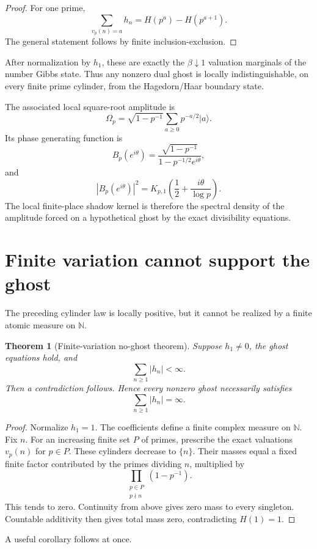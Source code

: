 \documentclass[11pt]{article}
\newtheorem{theorem}{Theorem}[section]
\theoremstyle{definition}
\theoremstyle{remark}
\newcommand{\N}{\mathbb N}
\begin{document}
\begin{proof}
For one prime,
\[
\sum_{v_p(n)=a}h_n
=
H(p^a)-H(p^{a+1}).
\]
The general statement follows by finite inclusion-exclusion.
\end{proof}

After normalization by \(h_1\), these are exactly the \(\beta\downarrow1\) valuation marginals of the number Gibbs state.  Thus any nonzero dual ghost is locally indistinguishable, on every finite prime cylinder, from the Hagedorn/Haar boundary state.

The associated local square-root amplitude is
\[
\Omega_p
=
\sqrt{1-p^{-1}}
\sum_{a\ge0}p^{-a/2}|a\rangle.
\]
Its phase generating function is
\[
B_p(e^{i\theta})
=
\frac{\sqrt{1-p^{-1}}}
{1-p^{-1/2}e^{i\theta}},
\]
and
\[
|B_p(e^{i\theta})|^2
=
K_{p,1}\!\left(
\frac12+\frac{i\theta}{\log p}
\right).
\]
The local finite-place shadow kernel is therefore the spectral density of the amplitude forced on a hypothetical ghost by the exact divisibility equations.

\section{Finite variation cannot support the ghost}

The preceding cylinder law is locally positive, but it cannot be realized by a finite atomic measure on \(\N\).

\begin{theorem}[Finite-variation no-ghost theorem]
Suppose \(h_1\ne0\), the ghost equations hold, and
\[
\sum_{n\ge1}|h_n|<\infty.
\]
Then a contradiction follows.  Hence every nonzero ghost necessarily satisfies
\[
\boxed{
\sum_{n\ge1}|h_n|=\infty.
}
\]
\end{theorem}

\begin{proof}
Normalize \(h_1=1\).  The coefficients define a finite complex measure on \(\N\).  Fix \(n\).  For an increasing finite set \(P\) of primes, prescribe the exact valuations \(v_p(n)\) for \(p\in P\).  These cylinders decrease to \(\{n\}\).  Their masses equal a fixed finite factor contributed by the primes dividing \(n\), multiplied by
\[
\prod_{\substack{p\in P\\p\nmid n}}
(1-p^{-1}).
\]
This tends to zero.  Continuity from above gives zero mass to every singleton.  Countable additivity then gives total mass zero, contradicting \(H(1)=1\).
\end{proof}

A useful corollary follows at once.
\end{document}
